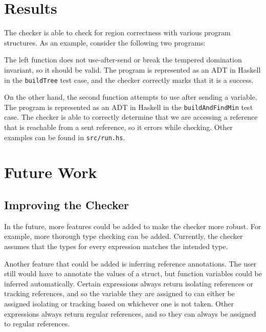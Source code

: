 \documentclass{article}
\begin{document}
  \section{Results}

  The checker is able to check for region correctness with various program structures.
  As an example,
    consider the following two programs:

  \begin{minipage}{.5\textwidth}
    
  \end{minipage}
  \begin{minipage}{.5\textwidth}
    
  \end{minipage}

  The left function does not use-after-send
    or break the tempered domination invariant,
    so it should be valid.
  The program is represented as an ADT in Haskell in the \verb+buildTree+ test case,
    and the checker correctly marks that it is a success.

  On the other hand,
    the second function attempts to use after sending a variable.
  The program is represented as an ADT in Haskell in the \verb+buildAndFindMin+ test case.
  The checker is able to correctly determine that we are accessing a reference
    that is reachable from a sent reference,
    so it errors while checking.
  Other examples
    can be found in \verb+src/run.hs+.

  \section{Future Work}

  \subsection{Improving the Checker}

  In the future,
    more features could be added to make the checker more robust.
  For example,
    more thorough type checking can be added.
  Currently,
    the checker assumes that the types for every expression matches the intended type.

  Another feature that could be added is inferring reference annotations.
  The user still would have to annotate the values of a struct,
    but function variables could be inferred automatically.
  Certain expressions always return isolating references or tracking references,
    and so the variable they are assigned to can either be assigned isolating or tracking
    based on whichever one is not taken.
  Other expressions always return regular references,
    and so they can always be assigned to regular references.
\end{document}
